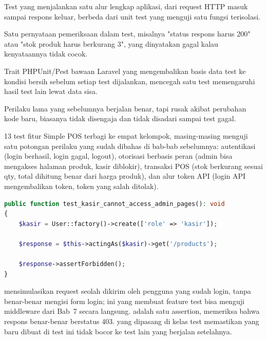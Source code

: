\begin{istilahpenting}
\begin{description}[leftmargin=0pt,style=nextline]
  \item[Feature Test] Test yang menjalankan satu alur lengkap aplikasi, dari request HTTP masuk sampai respons keluar, berbeda dari unit test yang menguji satu fungsi terisolasi.
  \item[Assertion] Satu pernyataan pemeriksaan dalam test, misalnya "status respons harus 200" atau "stok produk harus berkurang 3", yang dinyatakan gagal kalau kenyataannya tidak cocok.
  \item[RefreshDatabase] Trait PHPUnit/Pest bawaan Laravel yang mengembalikan basis data test ke kondisi bersih sebelum setiap test dijalankan, mencegah satu test memengaruhi hasil test lain lewat data sisa.
  \item[Regresi] Perilaku lama yang sebelumnya berjalan benar, tapi rusak akibat perubahan kode baru, biasanya tidak disengaja dan tidak disadari sampai test gagal.
\end{description}
\end{istilahpenting}

13 test fitur Simple POS terbagi ke empat kelompok, masing-masing
menguji satu potongan perilaku yang sudah dibahas di bab-bab
sebelumnya: autentikasi (login berhasil, login gagal, logout), otorisasi
berbasis peran (admin bisa mengakses halaman produk, kasir diblokir),
transaksi POS (stok berkurang sesuai qty, total dihitung benar dari
harga produk), dan alur token API (login API mengembalikan token, token
yang salah ditolak).

\begin{lstlisting}[language=php, title=\lstfile{tests/Feature/ProductAuthorizationTest.php}]
public function test_kasir_cannot_access_admin_pages(): void
{
    $kasir = User::factory()->create(['role' => 'kasir']);

    $response = $this->actingAs($kasir)->get('/products');

    $response->assertForbidden();
}
\end{lstlisting}

 mensimulasikan request seolah dikirim oleh
pengguna  yang sudah login, tanpa benar-benar mengisi
form login; ini yang membuat feature test bisa menguji middleware
 dari Bab~7 secara langsung.
 adalah satu assertion, memeriksa bahwa
respons benar-benar berstatus 403.  yang
dipasang di kelas test memastikan  yang baru dibuat
di test ini tidak bocor ke test lain yang berjalan setelahnya.

